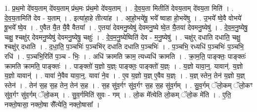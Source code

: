 \documentclass[17pt]{extarticle}
\begin{document}
1. प्र॒थ॒मो दे॑वय॒ताम् दे॑वय॒ताम् प्र॑थ॒मः प्र॑थ॒मो दे॑वय॒ताम् । . दे॒व॒य॒ता मितीति॑ देवय॒ताम् दे॑वय॒ता मिति॑ । . दे॒व॒य॒तामिति॑ देव - य॒ताम् । . इत्या॑हा॒हे तीत्या॑ह । . आ॒हो॒भये॑षू॒ भये᳚ ष्वाहा हो॒भये॑षु । . उ॒भये᳚ ष्वे॒वै वोभये॑ षू॒भये᳚ ष्वे॒व । . ए॒वैत यै॒त यै॒वै वैतया᳚ । . ए॒तया॑ देवमनु॒ष्येषु॑ देवमनु॒ष्ये ष्वे॒त यै॒तया॑ देवमनु॒ष्येषु॑ । . दे॒व॒म॒नु॒ष्येषु॒ चक्षु॒ श्चक्षु॑र् देवमनु॒ष्येषु॑ देवमनु॒ष्येषु॒ चक्षुः॑ । . दे॒व॒म॒नु॒ष्येष्विति॑ देव - म॒नु॒ष्येषु॑ । . चक्षु॑र् दधाति दधाति॒ चक्षु॒ श्चक्षु॑र् दधाति । . द॒धा॒ति॒ प॒ञ्चभिः॑ प॒ञ्चभि॑र् दधाति दधाति प॒ञ्चभिः॑ । . प॒ञ्चभि॒ रध्यधि॑ प॒ञ्चभिः॑ प॒ञ्चभि॒ रधि॑ । . प॒ञ्चभि॒रिति॑ प॒ञ्च - भिः॒ । . अधि॑ क्रामति क्राम॒ त्यध्यधि॑ क्रामति । . क्रा॒म॒ति॒ पाङ्क्तः॒ पाङ्क्तः॑ क्रामति क्रामति॒ पाङ्क्तः॑ । . पाङ्क्तो॑ य॒ज्ञो य॒ज्ञ्ः पाङ्क्तः॒ पाङ्क्तो॑ य॒ज्ञ्ः । . य॒ज्ञो यावा॒न्॒. यावान्॑. य॒ज्ञो य॒ज्ञो यावान्॑ । . यावा॑ ने॒वैव यावा॒न्॒. यावा॑ ने॒व । . ए॒व य॒ज्ञो य॒ज्ञ् ए॒वैव य॒ज्ञ्ः । . य॒ज्ञ् स्तेन॒ तेन॑ य॒ज्ञो य॒ज्ञ् स्तेन॑ । . तेन॑ स॒ह स॒ह तेन॒ तेन॑ स॒ह । . स॒ह सु॑व॒र्गꣳ सु॑व॒र्गꣳ स॒ह स॒ह सु॑व॒र्गम् । . सु॒व॒र्गम् ॅलो॒कम् ॅलो॒कꣳ सु॑व॒र्गꣳ सु॑व॒र्गम् ॅलो॒कम् । . सु॒व॒र्गमिति॑ सुवः - गम् । . लो॒क मे᳚त्येति लो॒कम् ॅलो॒क मे॑ति । . ए॒ति॒ नक्तो॒षासा॒ नक्तो॒षा सै᳚त्येति॒ नक्तो॒षासा᳚ । \newline
\end{document}
